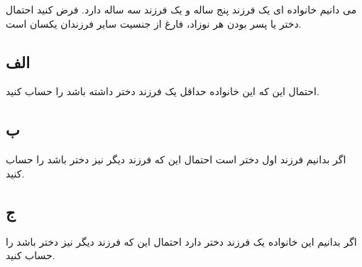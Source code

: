 می دانیم خانواده ای یک فرزند پنج ساله و یک فرزند سه ساله دارد. فرض کنید احتمال دختر یا پسر بودن هر نوزاد، فارغ از جنسیت سایر فرزندان یکسان است. 

\subsection*{الف}
احتمال این که این خانواده حداقل یک فرزند دختر داشته باشد را حساب کنید. 

\subsection*{ب}
اگر بدانیم فرزند اول دختر است احتمال این که فرزند دیگر نیز دختر باشد را حساب کنید. 

\subsection*{ج}
اگر بدانیم این خانواده یک فرزند دختر دارد احتمال این که فرزند دیگر نیز دختر باشد را حساب کنید.

\\
